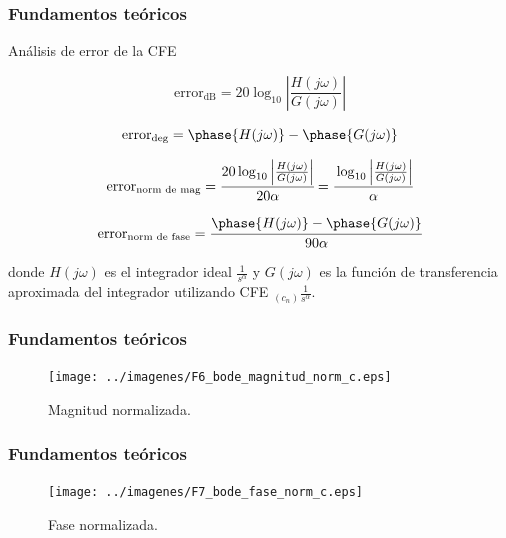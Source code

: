 \documentclass[10pt]{beamer}
\begin{document}
	\begin{frame}
		\frametitle{Fundamentos teóricos}
		\begin{block}{Análisis de error de la CFE}
		\begin{small}
		\begin{equation}
			\mathrm{error}_{\mathrm{dB}} = 20\log_{10} \left| \frac{H(j\omega)}{G(j\omega)} \right|
			\label{ec:error_sin_norm}
		\end{equation}
	
		\begin{equation}
			\mathrm{error}_{\mathrm{deg}} = \phase{H(j\omega)} - \phase{G(j\omega)}
		\end{equation}
		
		\begin{equation}
			\mathrm{error}_{\mathrm{norm\,\,de\,\,mag}} = \cfrac{ 20\log_{10} \left| \frac{H(j\omega)}{G(j\omega)} \right| }{20 \alpha} = \cfrac{ \log_{10} \left| \frac{H(j\omega)}{G(j\omega)} \right| }{ \alpha}
		\end{equation}
	
		\begin{equation}
			\mathrm{error}_{\mathrm{norm\,\,de\,\,fase}} = \cfrac{\phase{H(j\omega)} - \phase{G(j\omega)}}{90\alpha}
		\end{equation}
		\end{small}
		\justifying
		donde $H(j\omega)$ es el integrador ideal $\frac{1}{s^{\alpha}}$ y $G(j\omega)$ es la función de transferencia aproximada del integrador utilizando CFE $ _{(c_{n})} \frac{1}{s^{\alpha}}$. 
		\end{block}
	\end{frame}		
	\begin{frame}
		\frametitle{Fundamentos teóricos}
		\begin{figure}[hbtp]
			\caption{Magnitud normalizada.}
			\centering
			\texttt{[image: ../imagenes/F6\_bode\_magnitud\_norm\_c.eps]}
		\end{figure}
	\end{frame}	
	\begin{frame}
		\frametitle{Fundamentos teóricos}
		\begin{figure}[hbtp]
			\caption{Fase normalizada.}
			\centering
			\texttt{[image: ../imagenes/F7\_bode\_fase\_norm\_c.eps]}
		\end{figure}
	\end{frame}	
\end{document}
